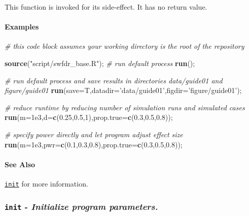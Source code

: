 \documentclass[]{article}
\newenvironment{Shaded}{\begin{snugshade}}{\end{snugshade}}
\newcommand{\KeywordTok}[1]{\textcolor[rgb]{0.13,0.29,0.53}{\textbf{{#1}}}}
\newcommand{\DataTypeTok}[1]{\textcolor[rgb]{0.13,0.29,0.53}{{#1}}}
\newcommand{\DecValTok}[1]{\textcolor[rgb]{0.00,0.00,0.81}{{#1}}}
\newcommand{\FloatTok}[1]{\textcolor[rgb]{0.00,0.00,0.81}{{#1}}}
\newcommand{\StringTok}[1]{\textcolor[rgb]{0.31,0.60,0.02}{{#1}}}
\newcommand{\CommentTok}[1]{\textcolor[rgb]{0.56,0.35,0.01}{\textit{{#1}}}}
\newcommand{\NormalTok}[1]{{#1}}
\let\oldparagraph\paragraph
\renewcommand{\paragraph}[1]{\oldparagraph{#1}\mbox{}}
\begin{document}
This function is invoked for its side-effect. It has no return value.

\paragraph{Examples}\label{examples}

\begin{Shaded}
\begin{Highlighting}[]
\CommentTok{# this code block assumes your working directory is the root of the repository}

\KeywordTok{source}\NormalTok{(}\StringTok{"script/swfdr_base.R"}\NormalTok{);}
\CommentTok{# run default process}
\KeywordTok{run}\NormalTok{();}

\CommentTok{# run default process and save results in directories data/guide01 and figure/guide01}
\KeywordTok{run}\NormalTok{(}\DataTypeTok{save=}\NormalTok{T,}\DataTypeTok{datadir=}\StringTok{'data/guide01'}\NormalTok{,}\DataTypeTok{figdir=}\StringTok{'figure/guide01'}\NormalTok{);}

\CommentTok{# reduce runtime by reducing number of simulation runs and simulated cases}
\KeywordTok{run}\NormalTok{(}\DataTypeTok{m=}\FloatTok{1e3}\NormalTok{,}\DataTypeTok{d=}\KeywordTok{c}\NormalTok{(}\FloatTok{0.25}\NormalTok{,}\FloatTok{0.5}\NormalTok{,}\DecValTok{1}\NormalTok{),}\DataTypeTok{prop.true=}\KeywordTok{c}\NormalTok{(}\FloatTok{0.3}\NormalTok{,}\FloatTok{0.5}\NormalTok{,}\FloatTok{0.8}\NormalTok{));}

\CommentTok{# specify power directly and let program adjust effect size}
\KeywordTok{run}\NormalTok{(}\DataTypeTok{m=}\FloatTok{1e3}\NormalTok{,}\DataTypeTok{pwr=}\KeywordTok{c}\NormalTok{(}\FloatTok{0.1}\NormalTok{,}\FloatTok{0.3}\NormalTok{,}\FloatTok{0.8}\NormalTok{),}\DataTypeTok{prop.true=}\KeywordTok{c}\NormalTok{(}\FloatTok{0.3}\NormalTok{,}\FloatTok{0.5}\NormalTok{,}\FloatTok{0.8}\NormalTok{));}
\end{Highlighting}
\end{Shaded}

\paragraph{See Also}\label{see-also}

\protect\hyperlink{init}{\texttt{init}} for more information.

\subsubsection{\texorpdfstring{\texttt{init} - \emph{Initialize program
parameters.}}{init - Initialize program parameters.}}\label{init---initialize-program-parameters.}
\end{document}
